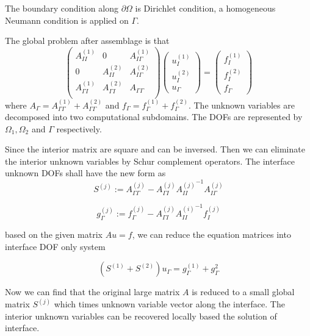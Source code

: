 The boundary condition along $ \partial \Omega  $ is Dirichlet condition, a homogeneous Neumann condition is applied on $ \Gamma $.

The global problem after assemblage is that
\begin{equation}
\begin{pmatrix}
A_{II}^{(1)} & 0 & A_{I\Gamma}^{(1)} \\
0 & A_{II}^{(2)} & A_{I\Gamma}^{(2)} \\
A_{\Gamma I}^{(1)} & A_{\Gamma I}^{(2)} & A_{\Gamma \Gamma}\\
\end{pmatrix} \begin{pmatrix}
u_{I}^{(1)} \\ u_{I}^{(2)} \\ u_{\Gamma}
\end{pmatrix} = \begin{pmatrix}
f_{I}^{(1)} \\ f_{I}^{(2)} \\ f_{\Gamma}
\end{pmatrix}
\end{equation}
where $ A_{\Gamma} = A_{\Gamma \Gamma}^{(1)} + A_{\Gamma \Gamma}^{(2)} $ and $ f_{\Gamma} = f_{\Gamma}^{(1)} + f_{\Gamma}^{(2)} $. The unknown variables are decomposed into two computational subdomains. The DOFs are represented by $ \Omega_{1}, \Omega_{2} $ and $ \Gamma $ respectively.

Since the interior matrix are square and can be inversed. Then we can eliminate the interior unknown variables by Schur complement operators. The interface unknown DOFs shall have the new form as
\begin{equation}
S^{(j)} := A_{\Gamma \Gamma}^{(j)} - A_{\Gamma I}^{(j)} {A_{II}^{(j)}}^{-1}A_{I \Gamma}^{(j)}
\end{equation}

\begin{equation}
g_{\Gamma}^{(j)} := f_{\Gamma}^{(j)} - A_{\Gamma I}^{(j)} {A_{II}^{(i)}}^{-1} f_{I}^{(j)}
\end{equation}

based on the given matrix $ Au = f $, we can reduce the equation matrices into interface DOF only system

\begin{equation}
(S^{(1)} + S^{(2)}) u_{\Gamma} = g_{\Gamma}^{(1)} + g_{\Gamma}^{2}
\end{equation}

Now we can find that the original large matrix $ A $ is reduced to a small global matrix $ S^{(j)} $ which times unknown variable vector along the interface. The interior unknown variables can be recovered locally based the solution of interface.


